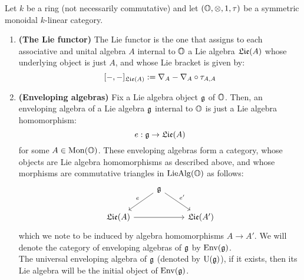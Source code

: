                     \begin{definition} \label{def: enveloping_algebras}
                        Let $k$ be a ring (not necessarily commutative) and let $(\O, \tensor, 1, \tau)$ be a symmetric monoidal $k$-linear category.
                            \begin{enumerate}
                                \item \textbf{(The Lie functor)} The Lie functor is the one that assigns to each associative and unital algebra $A$ internal to $\mathbb{O}$ a Lie algebra $\mathfrak{Lie}(A)$ whose underlying object is just $A$, and whose Lie bracket is given by:
                                    $$[-,-]_{\mathfrak{Lie}(A)} := \nabla_A - \nabla_A \circ \tau_{A,A}$$
                                \item \textbf{(Enveloping algebras)} Fix a Lie algebra object $\mathfrak{g}$ of $\mathbb{O}$. Then, an enveloping algebra of a Lie algebra $\mathfrak{g}$ internal to $\mathbb{O}$ is just a Lie algebra homomorphism:
                                    $$e: \mathfrak{g} \to \mathfrak{Lie}(A)$$
                                for some $A \in \mathrm{Mon}(\mathbb{O})$. These enveloping algebras form a category, whose objects are Lie algebra homomorphisms as described above, and whose morphisms are commutative triangles in $\mathrm{Lie}\mathrm{Alg}(\mathbb{O})$ as follows:
                                    $$
                                        \begin{tikzcd}
                                        	& {\g} \\
                                        	{\frakLie(A)} && {\frakLie(A')}
                                        	\arrow[from=2-1, to=2-3]
                                        	\arrow["{e}"', from=1-2, to=2-1]
                                        	\arrow["{e'}", from=1-2, to=2-3]
                                        \end{tikzcd}
                                    $$
                                which we note to be induced by algebra homomorphisms $A \to A'$. We will denote the category of enveloping algebras of $\mathfrak{g}$ by $\mathrm{Env}(\mathfrak{g})$. 
                                \\
                                The universal enveloping algebra of $\mathfrak{g}$ (denoted by $\mathrm{U}(\mathfrak{g})$), if it exists, then its Lie algebra will be the initial object of $\mathrm{Env}(\mathfrak{g})$. 
                            \end{enumerate}
                    \end{definition}
                    
